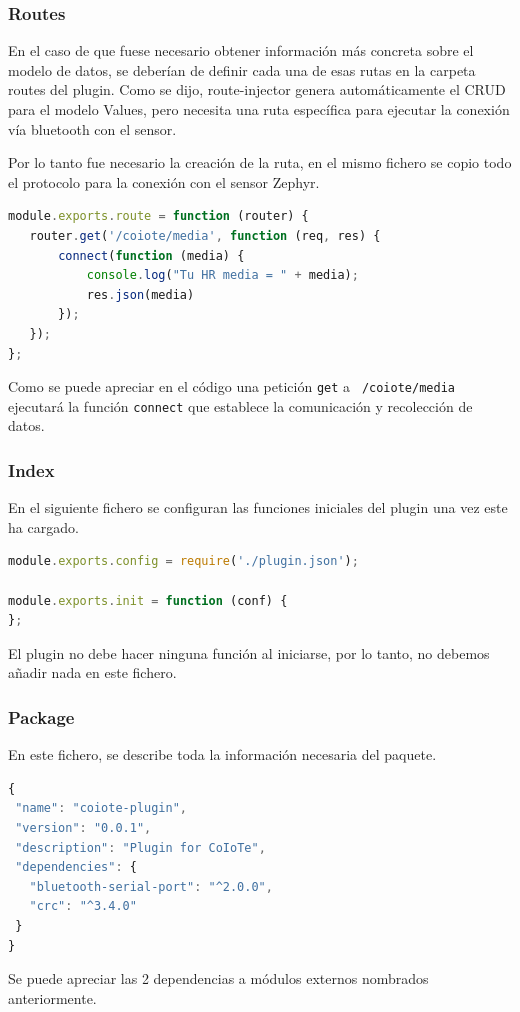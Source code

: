 \subsubsection{Routes}

En el caso de que fuese necesario obtener información más concreta sobre el
modelo de datos, se deberían de definir cada una de esas rutas en la carpeta
routes del plugin. Como se dijo, route-injector genera automáticamente el CRUD para el modelo Values, pero necesita una ruta específica para ejecutar la conexión vía bluetooth con el sensor. 

Por lo tanto fue necesario la creación de la ruta, en el mismo fichero se copio todo el protocolo para la conexión con el sensor Zephyr. 

\begin{lstlisting}[language=JavaScript]
module.exports.route = function (router) {
   router.get('/coiote/media', function (req, res) {
       connect(function (media) {
           console.log("Tu HR media = " + media);
           res.json(media)
       });
   });
};
\end{lstlisting}

Como se puede apreciar en el código una petición \texttt{get} a \texttt{ /coiote/media } ejecutará la función \texttt{connect} que establece la comunicación y recolección de datos.  

\subsubsection{Index}

En el siguiente fichero se configuran las funciones iniciales del plugin una vez
este ha cargado.

\begin{lstlisting}[language=JavaScript]
module.exports.config = require('./plugin.json');

module.exports.init = function (conf) { 
};
\end{lstlisting}

El plugin no debe hacer ninguna función al iniciarse, por lo tanto, no debemos añadir nada en este fichero.

\subsubsection{Package} 

En este fichero, se describe toda la información necesaria del paquete. 

\begin{lstlisting}[language=JavaScript]
{
 "name": "coiote-plugin",
 "version": "0.0.1",
 "description": "Plugin for CoIoTe",
 "dependencies": {
   "bluetooth-serial-port": "^2.0.0",
   "crc": "^3.4.0"
 }
}
\end{lstlisting}
Se puede apreciar las 2 dependencias a módulos externos nombrados anteriormente. 

